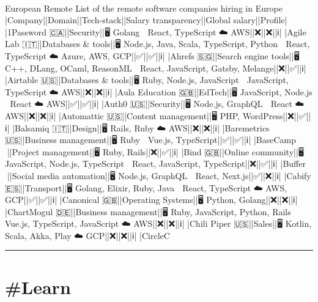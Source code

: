 \documentclass[10pt,a4paper]{article}
\begin{document}
\begin{multicols*}{2}
\paragraph{}
European Remote
List of the remote software companies hiring in Europe
|Company||Domain||Tech-stack||Salary transparency||Global salary||Profile|
|1Password 🇨🇦||Security||🖥 Golang 🎨 React, TypeScript ☁️ AWS||❌||❌||ℹ️|
|Agile Lab 🇮🇹||Databases \& tools||🖥 Node.js, Java, Scala, TypeScript, Python 🎨 React, TypeScript ☁️ Azure, AWS, GCP||✅||✅||ℹ️|
|Ahrefs 🇸🇬||Search engine tools||🖥 C++, DLang, OCaml, ReasonML 🎨 React, JavaScript, Gatsby, Melange||❌||✅||ℹ️|
|Airtable 🇺🇸||Databases \& tools||🖥 Ruby, Node.js, JavaScript 🎨 JavaScript, TypeScript ☁️ AWS||❌||❌||ℹ️|
|Aula Education 🇬🇧||EdTech||🖥 JavaScript, Node.js 🎨 React ☁️ AWS||✅||✅||ℹ️|
|Auth0 🇺🇸||Security||🖥 Node.js, GraphQL 🎨 React ☁️ AWS||❌||❌||ℹ️|
|Automattic 🇺🇸||Content management||🖥 PHP, WordPress||❌||✅||ℹ️|
|Balsamiq 🇮🇹||Design||🖥 Rails, Ruby ☁️ AWS||❌||❌||ℹ️|
|Baremetrics 🇺🇸||Business management||🖥 Ruby 🎨 Vue.js, TypeScript||✅||✅||ℹ️|
|BaseCamp 🏡||Project management||🖥 Ruby, Rails||❌||✅||ℹ️|
|Bind 🇬🇧||Online community||🖥 JavaScript, Node.js, TypeScript 🎨 React, JavaScript, TypeScript||❌||✅||ℹ️|
|Buffer 🏡||Social media automation||🖥 Node.js, GraphQL 🎨 React, Next.js||✅||❌||ℹ️|
|Cabify 🇪🇸||Transport||🖥 Golang, Elixir, Ruby, Java 🎨 React, TypeScript ☁️ AWS, GCP||✅||✅||ℹ️|
|Canonical 🇬🇧||Operating Systems||🖥 Python, Golang||❌||❌||ℹ️|
|ChartMogul 🇩🇪||Business management||🖥 Ruby, JavaScript, Python, Rails 🎨 Vue.js, TypeScript, JavaScript ☁️ AWS||❌||❌||ℹ️|
|Chili Piper 🇺🇸||Sales||🖥 Kotlin, Scala, Akka, Play ☁️ GCP||❌||❌||ℹ️|
|CircleC
\par\noindent\textcolor{red}{\rule{\linewidth}{0.2mm}}
\vfill
\null
\end{multicols*}

\newpage
\section{\#Learn}
\end{document}
